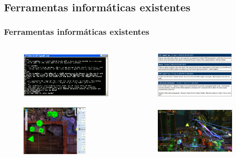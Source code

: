 \documentclass[12pt]{beamer}
\begin{document}
\subsection{Ferramentas informáticas existentes}
\begin{frame}
\frametitle{Ferramentas informáticas existentes}
\begin{columns}[T]
\begin{column}[T]{5cm}
\begin{figure}
\includegraphics[height=2.5cm]{figuras/presentacion/MUD1_screenshot.png} \\
\end{figure}
\begin{figure}
\includegraphics[height=2.5cm]{figuras/presentacion/roll20.png}
\end{figure}
\end{column}
\begin{column}[T]{5cm}
\begin{figure}
\includegraphics[height=2.5cm]{figuras/presentacion/300px-Darwin's_Soldiers_image.png} \\
\end{figure}
\begin{figure}
\includegraphics[height=2.5cm]{figuras/presentacion/WoW-4.jpg}
\end{figure}
\end{column}
\end{columns}
\end{frame}
\end{document}

